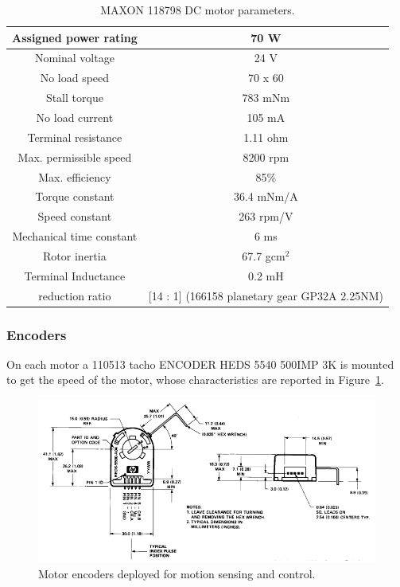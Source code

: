 \begin{table}[h]
	\begin{center}
		\begin{tabular}{|c|c|}
			\hline
			Assigned power rating &  70 W \\
			\hline
			Nominal voltage & 24 V \\
			\hline
			No load speed & 70 x 60  \\
			\hline
			Stall torque & 783 mNm \\
			\hline
			No load current & 105 mA \\ 
			\hline
			Terminal resistance & 1.11 ohm \\
			\hline 
			Max. permissible speed & 8200 rpm \\
			\hline
			Max. efficiency &  85\% \\
			\hline
			Torque constant & 36.4 mNm/A \\
			\hline
			Speed constant & 263 rpm/V \\
			\hline
			Mechanical time constant & 6 ms \\
			\hline 
			Rotor inertia & 67.7 gcm$^2$ \\
			\hline
			Terminal Inductance & 0.2 mH \\
			\hline  
			reduction ratio & [14 : 1] (166158 planetary gear GP32A 2.25NM) \\
			\hline 
		\end{tabular}
	\end{center}
	\caption{MAXON 118798 DC motor parameters.}
    \label{maxon}
\end{table}

\subsubsection{Encoders}
On each motor a 110513 tacho ENCODER HEDS 5540 500IMP 3K is mounted to get the speed of the motor, whose characteristics are reported in Figure~\ref{enc}.

\begin{figure}[h]
	\centering
	\includegraphics[draft=false,width=\textwidth]{images/03-foundation/enc}
	\caption{Motor encoders deployed for motion sensing and control.}
	\label{enc} 
\end{figure}

